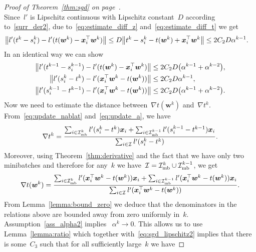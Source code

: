 \begin{proof}[Proof of Theorem~\ref{thm:sgd} on page~\pageref{thm:sgd}]
\begin{equation}
  \end{equation}
  Since~$l'$ is Lipschitz continuous with Lipschitz constant~$D$ according to~\ref{surr_der2}, due to~\eqref{eq:estimate_diff_z} and~\eqref{eq:estimate_diff_t} we get
  \begin{equation}\label{eq:sgd_lipschitz1}
    \begin{aligned}
      \norm{l'(t^k-s_i^k) - l'(t(\bm{w}^k)-\bm{x}_i^\top \bm{w}^k)}
        & \leq D \norm{t^k-s_i^k - t(\bm{w}^k)+ \bm{x}_i^\top \bm{w}^k}
        \leq  2C_2 D \alpha^{k-1}.
    \end{aligned}
  \end{equation}
  In an identical way we can show
  \begin{equation}\label{eq:sgd_lipschitz2}
    \begin{aligned}
      \norm{l'(t^{k-1}-s_i^{k-1}) - l'(t(\bm{w}^k)-\bm{x}_i^\top \bm{w}^k)}
        & \leq 2C_2D\Brac{\alpha^{k-1}+\alpha^{k-2}}, \\
      \norm{l'(s_i^k-t^k) - l'(\bm{x}_i^\top \bm{w}^k-t(\bm{w}^k))}
        & \leq 2C_2D\alpha^{k-1}, \\
      \norm{l'(s_i^{k-1}-t^{k-1}) - l'(\bm{x}_i^\top \bm{w}^k-t(\bm{w}^k))}
        & \leq 2C_2D\Brac{\alpha^{k-1}+\alpha^{k-2}}.
    \end{aligned}
  \end{equation}
  Now we need to estimate the distance between~$\nabla t(\bm{w}^k)$ and~$\nabla t^k$. From~\eqref{eq:update_nablat} and~\eqref{eq:update_a}, we have
  \begin{equation*}
    \nabla t^k
      = \frac{\sum_{i \in \mathcal{I}_{\text{mb}}^k} l'(s_i^k - t^k)\bm{x}_i + \sum_{i \in \mathcal{I}_{\text{mb}}^{k-1}} l'(s_i^{k-1} - t^{k-1}) \bm{x}_i}{\sum_{i \in \mathcal{I}} l'(s_i^k - t^k)}.
  \end{equation*}
  Moreover, using Theorem~\ref{thm:derivative} and the fact that we have only two minibatches and therefore for any~$k$ we have~$\mathcal{I} = \mathcal{I}_{\text{mb}}^k \cup \mathcal{I}_{\text{mb}}^{k-1}$, we get
  \begin{equation*}
    \nabla t(\bm{w}^k)
      = \frac{\sum_{i \in \mathcal{I}_{\text{mb}}^k} l'(\bm{x}_i^\top \bm{w}^k - t(\bm{w}^k))\bm{x}_i + \sum_{i \in \mathcal{I}_{\text{mb}}^{k-1}} l'(\bm{x}_i^\top \bm{w}^k - t(\bm{w}^k))\bm{x}_i}{\sum_{i \in \mathcal{I}} l'(\bm{x}_i^\top \bm{w}^k - t(\bm{w}^k))}.
  \end{equation*}
  From Lemma~\ref{lemma:bound_zero} we deduce that the denominators in the relations above are bounded away from zero uniformly in~$k$. Assumption~\ref{ass_alpha2} implies ~$\alpha^k \to 0$. This allows us to use Lemma~\ref{lemma:ratio} which together with~\eqref{eq:sgd_lipschitz2} implies that there is some~$C_3$ such that for all sufficiently large~$k$ we have

\end{proof}
